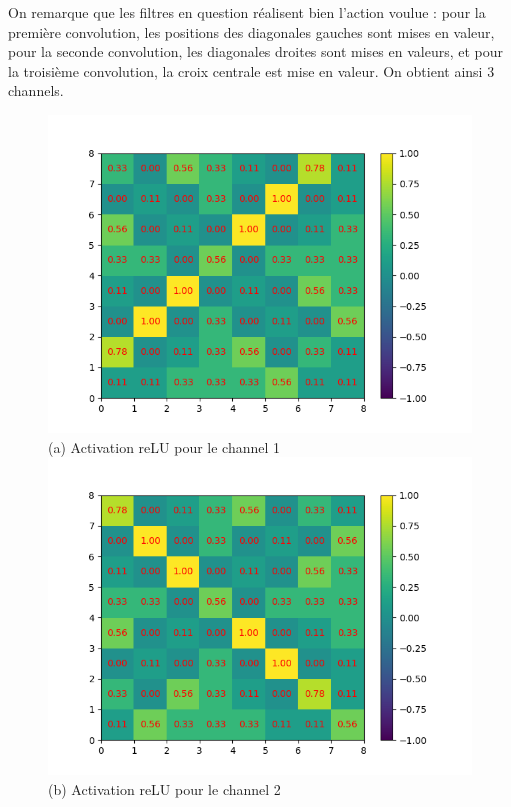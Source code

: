 On remarque que les filtres en question réalisent bien l'action voulue : pour la première convolution, les positions des 
diagonales gauches sont mises en valeur, pour la seconde convolution, les diagonales droites sont mises en valeurs, 
et pour la troisième convolution, la croix centrale est mise en valeur. On obtient ainsi 3 channels.
\begin{figure}[h]
        \includegraphics[width=\textwidth]{img/cnn_exemple/cross/activation_relu_1.png}
        \center
        (a) Activation reLU pour le channel 1
    \endminipage\hfill
        \includegraphics[width=\textwidth]{img/cnn_exemple/cross/activation_relu_2.png}
        \center
        (b) Activation reLU pour le channel 2

\end{figure}
